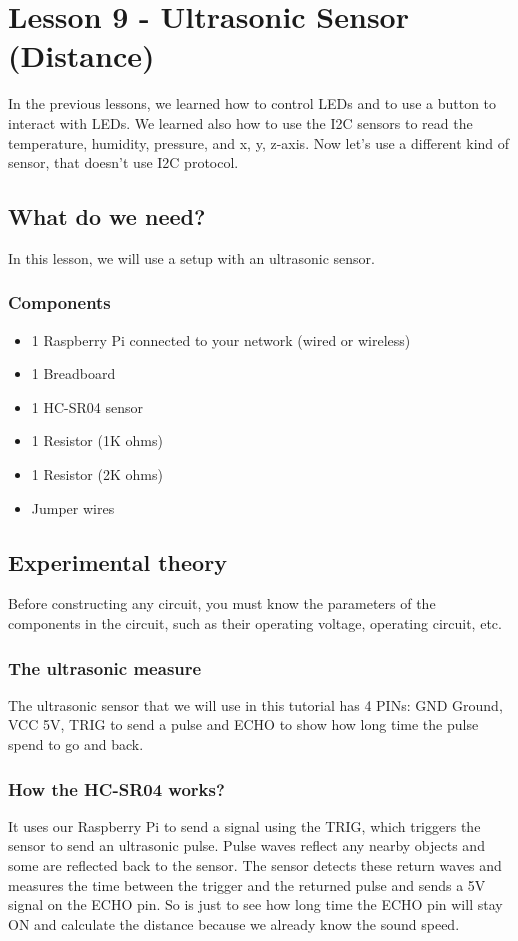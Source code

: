 \documentclass[10pt,twoside,english]{_support/latex/sbabook/sbabook}
\begin{document}
\frontmatter
\pagestyle{plain}

\tableofcontents*
\clearpage\listoffigures

\mainmatter

\chapter{Lesson 9 - Ultrasonic Sensor (Distance)}
In the previous lessons, we learned how to control LEDs and to use a button to interact with LEDs. We learned also how to use the I2C sensors to read the temperature, humidity, pressure, and x, y, z-axis. Now let's use a different kind of sensor, that doesn't use I2C protocol. 
\section{What do we need?}
In this lesson, we will use a setup with an ultrasonic sensor.
\subsection{Components}
\begin{itemize}
\item 1 Raspberry Pi connected to your network (wired or wireless)
\item 1 Breadboard
\item 1 HC-SR04 sensor
\item 1 Resistor (1K ohms)
\item 1 Resistor (2K ohms)
\item Jumper wires
\end{itemize}
\section{Experimental theory}
Before constructing any circuit, you must know the parameters of the components in the circuit, such as their operating voltage, operating circuit, etc.
\subsection{The ultrasonic measure}
The ultrasonic sensor that we will use in this tutorial has 4 PINs: GND Ground, VCC 5V, TRIG to send a pulse and ECHO to show how long time the pulse spend to go and back.  
\subsection{How the HC-SR04 works?}
It uses our Raspberry Pi to send a signal using the TRIG, which triggers the sensor to send an ultrasonic pulse. Pulse waves reflect any nearby objects and some are reflected back to the sensor. The sensor detects these return waves and measures the time between the trigger and the returned pulse and sends a 5V signal on the ECHO pin. So is just to see how long time the ECHO pin will stay ON and calculate the distance because we already know the sound speed. 
\end{document}

